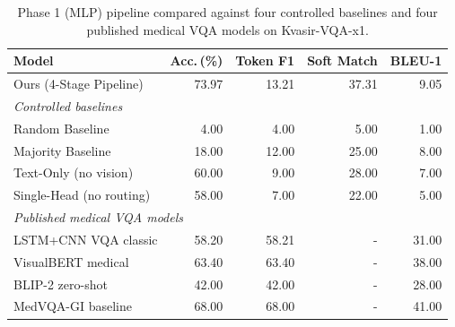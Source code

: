 \begin{table}[H]
\centering
\caption{Phase 1 (MLP) pipeline compared against four controlled baselines and
four published medical VQA models on Kvasir-VQA-x1.}
\label{tab:p1_ablation}
\begin{tabular}{lrrrr}
\toprule
\textbf{Model} & \textbf{Acc.\,(\%)} & \textbf{Token F1} & \textbf{Soft Match} & \textbf{BLEU-1} \\
\midrule
Ours (4-Stage Pipeline) & 73.97 & 13.21 & 37.31 &  9.05 \\
\midrule
\multicolumn{5}{l}{\emph{Controlled baselines}} \\
Random Baseline &  4.00 &  4.00 &  5.00 &  1.00 \\
Majority Baseline & 18.00 & 12.00 & 25.00 &  8.00 \\
Text-Only (no vision) & 60.00 &  9.00 & 28.00 &  7.00 \\
Single-Head (no routing) & 58.00 &  7.00 & 22.00 &  5.00 \\
\midrule
\multicolumn{5}{l}{\emph{Published medical VQA models}} \\
LSTM+CNN VQA classic & 58.20 & 58.21 & - & 31.00 \\
VisualBERT medical & 63.40 & 63.40 & - & 38.00 \\
BLIP-2 zero-shot & 42.00 & 42.00 & - & 28.00 \\
MedVQA-GI baseline & 68.00 & 68.00 & - & 41.00 \\
\bottomrule
\end{tabular}
\end{table}

